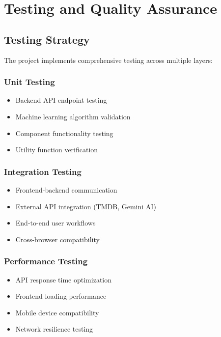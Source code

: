 \documentclass[12pt,a4paper]{article}
\begin{document}
\section{Testing and Quality Assurance}

\subsection{Testing Strategy}
The project implements comprehensive testing across multiple layers:

\subsubsection{Unit Testing}
\begin{itemize}
    \item Backend API endpoint testing
    \item Machine learning algorithm validation
    \item Component functionality testing
    \item Utility function verification
\end{itemize}

\subsubsection{Integration Testing}
\begin{itemize}
    \item Frontend-backend communication
    \item External API integration (TMDB, Gemini AI)
    \item End-to-end user workflows
    \item Cross-browser compatibility
\end{itemize}

\subsubsection{Performance Testing}
\begin{itemize}
    \item API response time optimization
    \item Frontend loading performance
    \item Mobile device compatibility
    \item Network resilience testing
\end{itemize}
\end{document}
